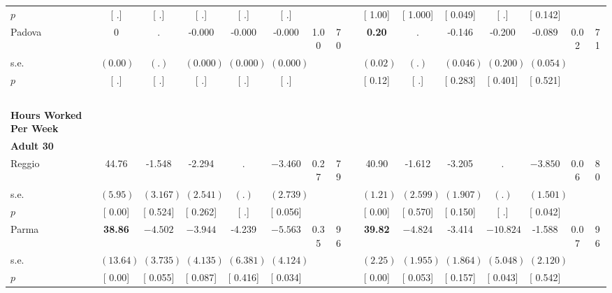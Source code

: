 \begin{longtable}{L{8em} c c c c c c c p{1em} c c c c c c c}
\quad \quad \quad \quad $ p$ & [        .] & [        .] & [        .] & [        .] & [        .] & & & & [     1.00] & [    1.000] & [    0.049] & [        .] & [    0.142] & &  \\[1em]
\quad \quad \quad Padova& 0 &         . &    -0.000 &    -0.000 &    -0.000 &      1.00 &        70 & & \textbf{     0.20} &         . &    -0.146 &    -0.200 &    -0.089 &      0.02 &        71  \\*
\quad \quad \quad \quad s.e.& $ (     0.00)$ & $ (        .)$ & $ (    0.000)$ & $ (    0.000)$ & $ (    0.000)$ & & & & $ (     0.02)$ & $ (        .)$ & $ (    0.046)$ & $ (    0.200)$ & $ (    0.054)$ & &  \\*
\quad \quad \quad \quad $ p$ & [        .] & [        .] & [        .] & [        .] & [        .] & & & & [     0.12] & [        .] & [    0.283] & [    0.401] & [    0.521] & &  \\[1em]
~\\[1em]
\textbf{Hours Worked Per Week} \\*
\quad \quad \textbf{Adult 30} & & & & & & & & & & & & & & & \\* 
\quad \quad \quad Reggio& 44.76 &    -1.548 &    -2.294 &         . & $ \mathbf{   -3.460}$ &      0.27 &        79 & & 40.90 &    -1.612 &    -3.205 &         . & $ \mathbf{   -3.850}$ &      0.06 &        80  \\*
\quad \quad \quad \quad s.e.& $ (     5.95)$ & $ (    3.167)$ & $ (    2.541)$ & $ (        .)$ & $ (    2.739)$ & & & & $ (     1.21)$ & $ (    2.599)$ & $ (    1.907)$ & $ (        .)$ & $ (    1.501)$ & &  \\*
\quad \quad \quad \quad $ p$ & [     0.00] & [    0.524] & [    0.262] & [        .] & [    0.056] & & & & [     0.00] & [    0.570] & [    0.150] & [        .] & [    0.042] & &  \\[1em]
\quad \quad \quad Parma& \textbf{    38.86} & $ \mathbf{   -4.502}$ & $ \mathbf{   -3.944}$ &    -4.239 & $ \mathbf{   -5.563}$ &      0.35 &        96 & & \textbf{    39.82} & $ \mathbf{   -4.824}$ &    -3.414 & $ \mathbf{  -10.824}$ &    -1.588 &      0.07 &        96  \\*
\quad \quad \quad \quad s.e.& $ (    13.64)$ & $ (    3.735)$ & $ (    4.135)$ & $ (    6.381)$ & $ (    4.124)$ & & & & $ (     2.25)$ & $ (    1.955)$ & $ (    1.864)$ & $ (    5.048)$ & $ (    2.120)$ & &  \\*
\quad \quad \quad \quad $ p$ & [     0.00] & [    0.055] & [    0.087] & [    0.416] & [    0.034] & & & & [     0.00] & [    0.053] & [    0.157] & [    0.043] & [    0.542] & &  \\[1em]

\end{longtable}
